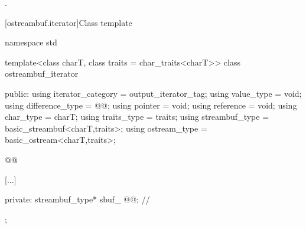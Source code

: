 \begin{itemdescr}
\pnum
\returns
{}.
\end{itemdescr}


[ostreambuf.iterator]{Class template }

%
\begin{codeblock}
namespace std {
  template<class charT, class traits = char_traits<charT>>
  class ostreambuf_iterator {
  public:
    using iterator_category = output_iterator_tag;
    using value_type        = void;
    using difference_type   = @@;
    using pointer           = void;
    using reference         = void;
    using char_type         = charT;
    using traits_type       = traits;
    using streambuf_type    = basic_streambuf<charT,traits>;
    using ostream_type      = basic_ostream<charT,traits>;

    @@

    [...]

  private:
    streambuf_type* sbuf_ @@;    // \expos
  };
}
\end{codeblock}
